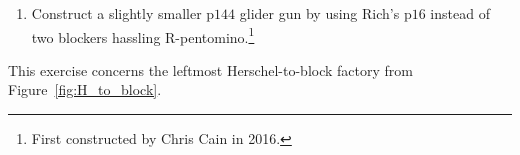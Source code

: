 \begin{multicols}{2}
\begin{problem}
\begin{enumerate}[label=\bf\color{ocre}(\alph*)]
		\item Construct a slightly smaller p$144$ glider gun by using Rich's p$16$ instead of two blockers hassling R-pentomino.\footnote{First constructed by Chris Cain in 2016.}
	\end{enumerate}
\end{problem}





\mfilbreak


\begin{problem}\label{exer:block_factory_is_tripler}
	This exercise concerns the leftmost Herschel-to-block factory from Figure~\ref{fig:H_to_block}.\smallskip
	

\end{problem}
\end{multicols}
